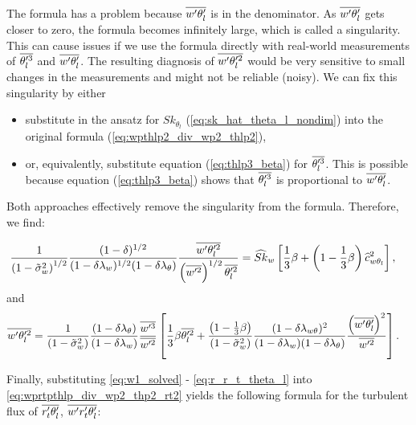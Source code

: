 The formula has a problem because $\overline{w' \theta_l'}$ is in the denominator.
As $\overline{w' \theta_l'}$ gets closer to zero, the formula becomes infinitely large, which is called a singularity.
This can cause issues if we use the formula directly with real-world measurements of $\overline{\theta_l'^3}$ and $\overline{w' \theta_l'}$.
The resulting diagnosis of $\overline{w' \theta_l'^2}$ would be very sensitive to small changes in the measurements and might not be reliable (noisy).
We can fix this singularity by either
\begin{itemize}
    \item substitute in the ansatz for $Sk_{\theta_l}$ (\cref{eq:sk_hat_theta_l_nondim}) into the original formula (\cref{eq:wpthlp2_div_wp2_thlp2}),
    \item or, equivalently, substitute equation (\ref{eq:thlp3_beta}) for $\overline{\theta_l'^3}$.
    This is possible because equation (\ref{eq:thlp3_beta}) shows that $\overline{\theta_l'^3}$ is proportional to $\overline{w' \theta_l'}$.
\end{itemize}
Both approaches effectively remove the singularity from the formula.
Therefore, we find:

\begin{align}
    \label{eq:wpthlp2_div_wp2_thlp2_sk_w}
    \frac{1}{\left( 1 - \tilde{\sigma}_w^2 \right)^{1/2}} \frac{(1-\delta)^{1/2}}{(1-\delta \lambda_w)^{1/2} (1-\delta \lambda_\theta)} \frac{\overline{w'\theta_l'^2}}{\left(\overline{w'^2}\right)^{1/2} \overline{\theta_l'^2}}
    &= \widehat{Sk}_w \left[\frac{1}{3} \beta + \left(1 - \frac{1}{3} \beta \right) \widehat{c}_{w\theta_l}^2 \right],
\end{align}
and
\begin{align}
    \label{eq:wpthlp2_beta}
    \overline{w'\theta_l'^2}
    &= \frac{1}{\left( 1 - \tilde{\sigma}_w^2 \right)} \frac{(1-\delta \lambda_\theta)}{(1-\delta \lambda_w)} \frac{\overline{w'^3}}{\overline{w'^2}} \left[ \frac{1}{3} \beta \overline{\theta_l'^2} + \frac{\left( 1-\frac{1}{3} \beta \right)}{\left( 1 - \tilde{\sigma}_w^2 \right)} \frac{(1-\delta \lambda_{w \theta})^2}{(1-\delta \lambda_w)(1-\delta \lambda_\theta)} \frac{\left( \overline{w'\theta_l'} \right)^2}{\overline{w'^2}}\right].
\end{align}

Finally, substituting \cref{eq:w1_solved} - \cref{eq:r_r_t_theta_l} into \cref{eq:wprtpthlp_div_wp2_thp2_rt2} yields the following formula for the turbulent flux of $\overline{r_t' \theta_l'}$, $\overline{w' r_t' \theta_l'}$:

